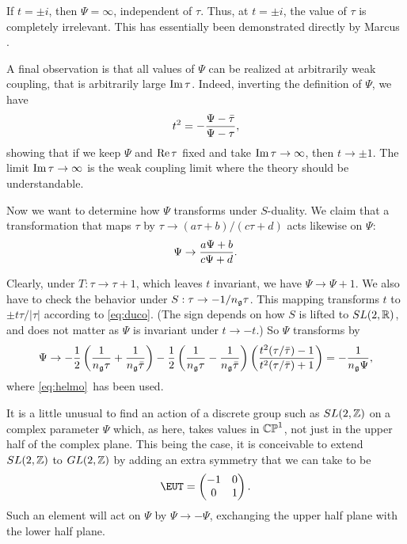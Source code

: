 If $t=\pm i$, then $\Psi=\infty$, independent of $\tau$.  Thus, at
$t=\pm i$, the value of $\tau$ is completely irrelevant.  This has
essentially been demonstrated directly by Marcus \cite{ref53}.

A final observation is that all values of $\Psi$ can be realized
at arbitrarily weak coupling, that is arbitrarily large ${\rm
Im}\,\tau$.  Indeed, inverting the definition of $\Psi$, we have
\setcounter{equation}{51}
\begin{equation}\label{eq:helmo}
t^2=-{\Psi-\bar\tau\over \Psi-\tau},
\end{equation}
 showing that if
we keep $\Psi$ and ${\rm Re}\,\tau$ fixed and take ${\rm
Im}\,\tau\to\infty$, then $t\to \pm 1$.  The limit ${\rm
Im}\,\tau\to\infty$  is the weak coupling limit where the theory
should be understandable.

\par{}

Now we want to determine how $\Psi$ transforms under $S$-duality.
We claim that a transformation that maps $\tau$ by $\tau\to
(a\tau+b)/(c\tau+d)$ acts likewise on $\Psi$: %
\setcounter{equation}{52}
\begin{equation}\label{eq:yrto}
\Psi\to
{a\Psi+b\over c\Psi+d}.
\end{equation}

Clearly, under $T:\tau\to\tau+1$, which leaves $t$ invariant, we
have $\Psi\to \Psi+1$.  We also have to check the behavior under
$S:\tau\to -1/n_{\frak g}\tau$.  This mapping transforms $t$ to
$\pm t\tau/|\tau|$ according to \eqref{eq:duco}. (The sign depends on how
$S$ is lifted to $SL(2,\Bbb{R})$, and does not matter as $\Psi$ is
invariant under $t\to -t$.) So $\Psi$ transforms by
\setcounter{equation}{53}
\begin{equation}\label{eq:nelmo}
\Psi\to -{1\over 2}\left({1\over n_{\frak
g}\tau}+{1\over n_{\frak g}\bar \tau}\right)-{1\over
2}\left({1\over n_{\frak g}\tau}-{1\over n_{\frak
g}\bar\tau}\right)\left({t^2(\tau/ \bar\tau)-1\over t^2(
\tau/\bar\tau)+1}\right)=-{1\over n_{\frak g} \Psi},
\end{equation}
 where
\eqref{eq:helmo}\ has been used.

\par{}

It is a little unusual to find an action of a discrete group such
as $SL(2,\Bbb{Z})$ on a complex parameter $\Psi$ which, as here,
takes values in $\Bbb{CP}^1$, not just in the upper half of the
complex plane.  This being the case, it is conceivable to extend
$SL(2,\Bbb{Z})$ to $GL(2,\Bbb{Z})$ by adding an extra symmetry
that we can take to be %
\setcounter{equation}{54}
\begin{equation}\label{eq:ysnon}
{\EUT}=\left(\begin{matrix}-1 & 0 \\
0 & 1\end{matrix}\right).
\end{equation}
  Such an element will act on $\Psi$ by $\Psi\to
-\Psi$, exchanging the upper half plane with the lower half plane.

